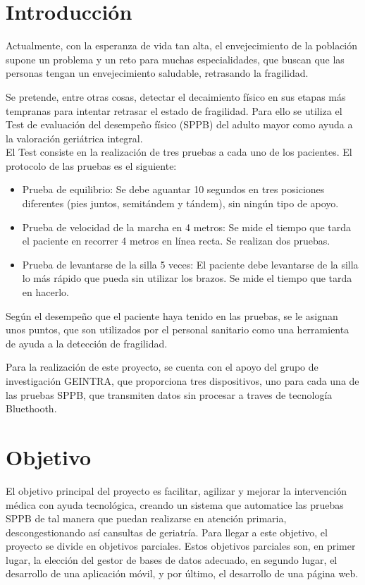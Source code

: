\documentclass[12pt,oneside,a4paper]{article}
\begin{document}
\newpage
\section{Introducción}
\hline

Actualmente, con la esperanza de vida tan alta, el envejecimiento de la población supone un problema y un reto para muchas especialidades, que buscan que las personas tengan un envejecimiento saludable, retrasando la fragilidad.

 Se pretende, entre otras cosas, detectar el decaimiento físico en sus etapas más tempranas para intentar retrasar el estado de fragilidad. Para ello se utiliza el Test de evaluación del desempeño físico \cite{welch2021short} (SPPB) del adulto mayor como ayuda a la valoración geriátrica integral. \\
El Test consiste en la realización de tres pruebas a cada uno de los pacientes. El protocolo de las pruebas es el siguiente: \\
\begin{itemize}
\item Prueba de equilibrio: Se debe aguantar 10 segundos en tres posiciones diferentes (pies juntos, semitándem y tándem), sin ningún tipo de apoyo. \\
\item Prueba de velocidad de la marcha en 4 metros: Se mide el tiempo que tarda el paciente en recorrer 4 metros en línea recta. Se realizan dos pruebas.\\
\item Prueba de levantarse de la silla 5 veces: El paciente debe levantarse de la silla lo más rápido que pueda sin utilizar los brazos. Se mide el tiempo que tarda en hacerlo.
\end{itemize}
Según el desempeño que el paciente haya tenido en las pruebas, se le asignan unos puntos, que son utilizados por el personal sanitario como una herramienta de ayuda a la detección de fragilidad.

Para la realización de este proyecto, se cuenta con el apoyo del grupo de investigación GEINTRA, que proporciona tres dispositivos, uno para cada una de las pruebas SPPB, que transmiten datos sin procesar a traves de tecnología Bluethooth.





\section{Objetivo}
\hline
El objetivo principal del proyecto es facilitar, agilizar y mejorar la intervención médica con ayuda tecnológica, creando un sistema que automatice las pruebas SPPB de tal manera que puedan realizarse en atención primaria, descongestionando así cansultas de geriatría. 
Para llegar a este objetivo, el proyecto se divide en objetivos parciales. Estos objetivos parciales son, en primer lugar, la elección del gestor de bases de datos adecuado, en segundo lugar, el desarrollo de una aplicación móvil, y por último, el desarrollo de una página web.
\end{document}
